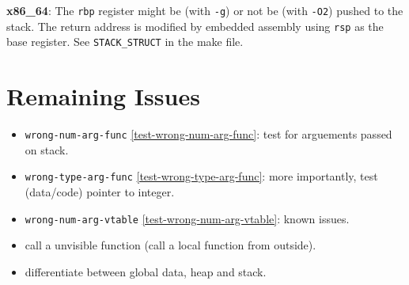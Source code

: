 \documentclass[a4paper]{book}
\begin{document}
\textbf{x86\_64}: The \texttt{rbp} register might be (with \texttt{-g}) or not be (with \texttt{-O2}) pushed to the stack.
The return address is modified by embedded assembly using \texttt{rsp} as the base register. See \texttt{STACK\_STRUCT} in the make file.

\chapter{Remaining Issues}

\begin{itemize}
  \item \texttt{wrong-num-arg-func} \ref{test-wrong-num-arg-func}: test for arguements passed on stack.
  \item \texttt{wrong-type-arg-func} \ref{test-wrong-type-arg-func}: more importantly, test (data/code) pointer to integer.
  \item \texttt{wrong-num-arg-vtable} \ref{test-wrong-num-arg-vtable}: known issues.
  \item call a unvisible function (call a local function from outside).
  \item differentiate between global data, heap and stack.
\end{itemize}
\end{document}

